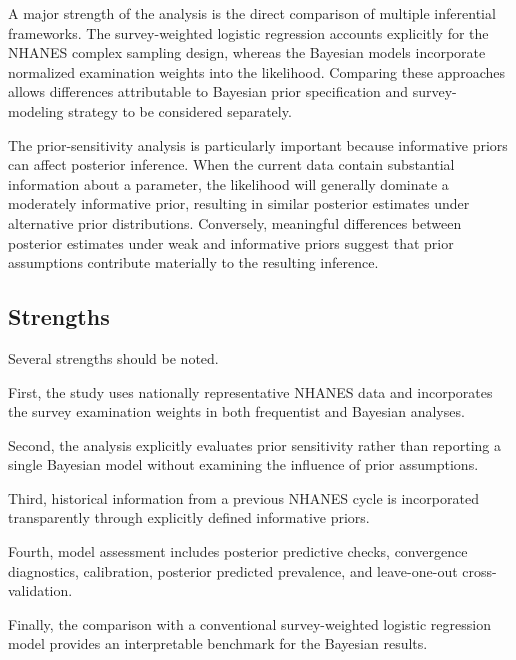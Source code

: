 \documentclass[12pt]{article}
\begin{document}
A major strength of the analysis is the direct comparison of multiple inferential frameworks. The survey-weighted logistic regression accounts explicitly for the NHANES complex sampling design, whereas the Bayesian models incorporate normalized examination weights into the likelihood. Comparing these approaches allows differences attributable to Bayesian prior specification and survey-modeling strategy to be considered separately.

The prior-sensitivity analysis is particularly important because informative priors can affect posterior inference. When the current data contain substantial information about a parameter, the likelihood will generally dominate a moderately informative prior, resulting in similar posterior estimates under alternative prior distributions. Conversely, meaningful differences between posterior estimates under weak and informative priors suggest that prior assumptions contribute materially to the resulting inference.


\subsection{Strengths}

Several strengths should be noted.

First, the study uses nationally representative NHANES data and incorporates the survey examination weights in both frequentist and Bayesian analyses.

Second, the analysis explicitly evaluates prior sensitivity rather than reporting a single Bayesian model without examining the influence of prior assumptions.

Third, historical information from a previous NHANES cycle is incorporated transparently through explicitly defined informative priors.

Fourth, model assessment includes posterior predictive checks, convergence diagnostics, calibration, posterior predicted prevalence, and leave-one-out cross-validation.

Finally, the comparison with a conventional survey-weighted logistic regression model provides an interpretable benchmark for the Bayesian results.

\end{document}
